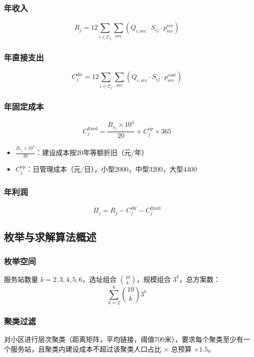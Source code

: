\documentclass[12pt,a4paper]{article}
\begin{document}
\subsubsection{年收入}
\[
R_j = 12 \sum_{i \in \mathcal{C}_j} \sum_{\text{svc}} \left( Q_{i,\text{svc}} \cdot S_{ij} \cdot p_{\text{svc}}^{\text{rev}} \right)
\]

\subsubsection{年直接支出}
\[
C_j^{\text{dir}} = 12 \sum_{i \in \mathcal{C}_j} \sum_{\text{svc}} \left( Q_{i,\text{svc}} \cdot S_{ij} \cdot p_{\text{svc}}^{\text{cost}} \right)
\]

\subsubsection{年固定成本}
\[
C_j^{\text{fixed}} = \frac{B_{s_j} \times 10^4}{20} + C_j^{\text{op}} \times 365
\]
\begin{itemize}[leftmargin=*]
\item $\frac{B_{s_j} \times 10^4}{20}$：建设成本按20年等额折旧（元/年）
\item $C_j^{\text{op}}$：日管理成本（元/日），小型2000，中型3200，大型4400
\end{itemize}

\subsubsection{年利润}
\[
\Pi_j = R_j - C_j^{\text{dir}} - C_j^{\text{fixed}}
\]

\subsection{枚举与求解算法概述}

\subsubsection{枚举空间}
服务站数量 $k = 2,3,4,5,6$，选址组合 $\binom{10}{k}$，规模组合 $3^k$，总方案数：
\[
\sum_{k=2}^{6} \binom{10}{k} 3^k
\]

\subsubsection{聚类过滤}
对小区进行层次聚类（距离矩阵，平均链接，阈值700米），要求每个聚类至少有一个服务站，且聚类内建设成本不超过该聚类人口占比 $\times$ 总预算 $\times 1.5$。
\end{document}
